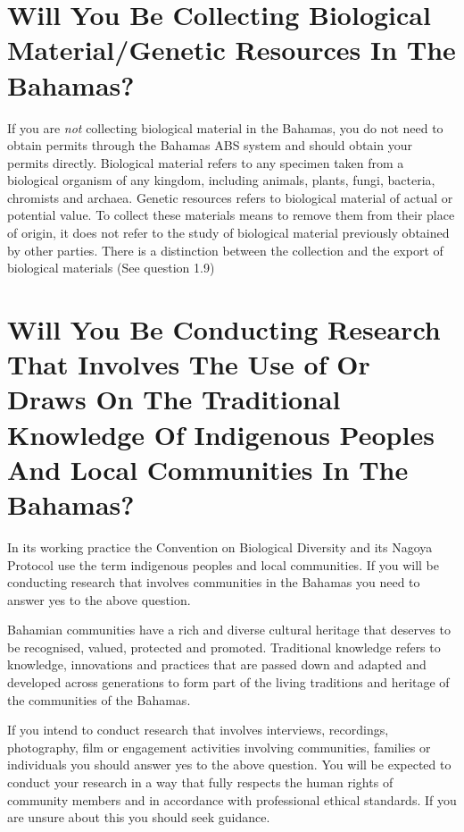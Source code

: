 \documentclass[
]{book}
\begin{document}
\hypertarget{will-you-be-collecting-biological-materialgenetic-resources-in-the-bahamas}{%
\section{Will You Be Collecting Biological Material/Genetic Resources In The Bahamas?}\label{will-you-be-collecting-biological-materialgenetic-resources-in-the-bahamas}}

If you are \emph{not} collecting biological material in the Bahamas, you do not need to obtain permits through the Bahamas ABS system and should obtain your permits directly. Biological material refers to any specimen taken from a biological organism of any kingdom, including animals, plants, fungi, bacteria, chromists and archaea. Genetic resources refers to biological material of actual or potential value. To collect these materials means to remove them from their place of origin, it does not refer to the study of biological material previously obtained by other parties. There is a distinction between the collection and the export of biological materials (See question 1.9)

\hypertarget{will-you-be-conducting-research-that-involves-the-use-of-or-draws-on-the-traditional-knowledge-of-indigenous-peoples-and-local-communities-in-the-bahamas}{%
\section{Will You Be Conducting Research That Involves The Use of Or Draws On The Traditional Knowledge Of Indigenous Peoples And Local Communities In The Bahamas?}\label{will-you-be-conducting-research-that-involves-the-use-of-or-draws-on-the-traditional-knowledge-of-indigenous-peoples-and-local-communities-in-the-bahamas}}

In its working practice the Convention on Biological Diversity and its Nagoya Protocol use the term indigenous peoples and local communities. If you will be conducting research that involves communities in the Bahamas you need to answer yes to the above question.

Bahamian communities have a rich and diverse cultural heritage that deserves to be recognised, valued, protected and promoted. Traditional knowledge refers to knowledge, innovations and practices that are passed down and adapted and developed across generations to form part of the living traditions and heritage of the communities of the Bahamas.

If you intend to conduct research that involves interviews, recordings, photography, film or engagement activities involving communities, families or individuals you should answer yes to the above question. You will be expected to conduct your research in a way that fully respects the human rights of community members and in accordance with professional ethical standards. If you are unsure about this you should seek guidance.
\end{document}
